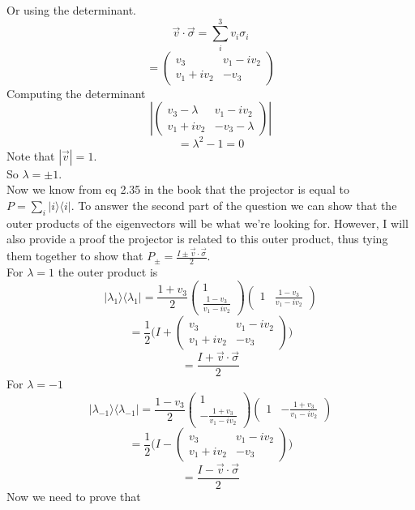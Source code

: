 \documentclass[12pt]{article}
\newcommand{\ket}[1]{\vert{#1}\rangle}
\newcommand{\bra}[1]{\langle{#1}\vert}
\begin{document}
\begin{enumerate}
Or using the determinant. 
$$\vec{v} \cdot \vec{\sigma} = \sum_i^3 v_i \sigma_i $$
$$ = \left( \begin{array}{cc} v_3 & v_1 -iv_2 \\ v_1 + iv_2 & -v_3 \end{array} \right)$$
Computing the determinant 
$$| \left( \begin{array}{cc} v_3-\lambda & v_1 -iv_2 \\ v_1 + iv_2 & -v_3-\lambda \end{array} \right)|$$
$$ = \lambda^2 -1 =0 $$
Note that $|\vec{v} | =1 $.
\\ 
So $\lambda = \pm 1$.
\\
Now we know from eq 2.35 in the book that the projector is equal to $P = \sum_i \ket{i} \bra{i} $. To answer the second part of the question we can show that the outer products of the eigenvectors will be what we're looking for. However, I will also provide a proof the projector is related to this outer product, thus tying them together to show that $P_{\pm} = \frac{I \pm \vec{v} \cdot \vec{\sigma}} {2} $.
\\
For $\lambda = 1$ the outer product is 
$$ \ket{\lambda_1}\bra{\lambda_1} = \frac{1+v_3}{2} \left( \begin{array}{cc} 1  \\ \frac{1-v_3}{v_1 -iv_2} \end{array} \right)\left( \begin{array}{cc} 1 & \frac{1-v_3}{v_1 -iv_2} \end{array} \right) $$
$$ = \frac{1}{2} \Big(I +  \left( \begin{array}{cc} v_3 & v_1-iv_2  \\ v_1+iv_2 & -v_3 \end{array} \right)\Big) $$
$$ = \frac{I+ \vec{v}\cdot \vec{\sigma}}{2} $$
For $\lambda = -1$ 
$$ \ket{\lambda_{-1}}\bra{\lambda_{-1}} = \frac{1-v_3}{2} \left( \begin{array}{cc} 1  \\ -\frac{1+v_3}{v_1 -iv_2} \end{array} \right)\left( \begin{array}{cc} 1 & -\frac{1+v_3}{v_1 -iv_2} \end{array} \right) $$
$$ = \frac{1}{2} \Big(I -  \left( \begin{array}{cc} v_3 & v_1-iv_2  \\ v_1+iv_2 & -v_3 \end{array} \right)\Big) $$
$$ = \frac{I- \vec{v}\cdot \vec{\sigma}}{2} $$
Now we need to prove that 

\end{enumerate}
\end{document}
